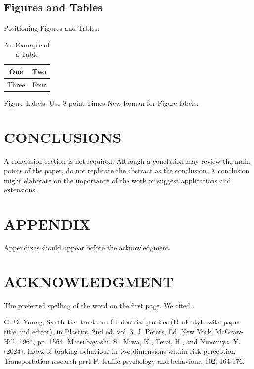 \documentclass[letterpaper, 10 pt, conference]{ieeeconf}  %
\begin{document}
\subsection{Figures and Tables}
Positioning Figures and Tables.

\begin{table}[h]
\caption{An Example of a Table}
\label{table_example}
\begin{center}
\begin{tabular}{|c||c|}
\hline
One & Two\\
\hline
Three & Four\\
\hline
\end{tabular}
\end{center}
\end{table}


Figure Labels: Use 8 point Times New Roman for Figure labels. 

\section{CONCLUSIONS}
A conclusion section is not required. Although a conclusion may review the main points of the paper, do not replicate the abstract as the conclusion. A conclusion might elaborate on the importance of the work or suggest applications and extensions. 

\addtolength{\textheight}{-12cm}  

\section*{APPENDIX}
Appendixes should appear before the acknowledgment.

\section*{ACKNOWLEDGMENT}
The preferred spelling of the word on the first page. We cited \cite{c2}.

\begin{thebibliography}{99}

 G. O. Young, Synthetic structure of industrial plastics (Book style with paper title and editor), in Plastics, 2nd ed. vol. 3, J. Peters, Ed.  New York: McGraw-Hill, 1964, pp. 1564.
 Matsubayashi, S., Miwa, K., Terai, H., and Ninomiya, Y. (2024). Index of braking behaviour in two dimensions within risk perception. Transportation research part F: traffic psychology and behaviour, 102, 164-176.

\end{thebibliography}
\end{document}
